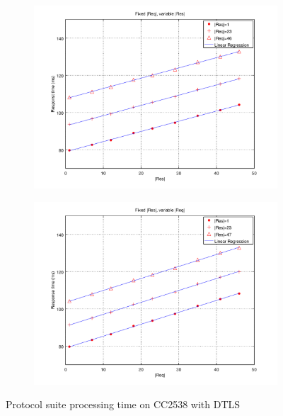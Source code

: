 \begin{figure}[ht!]
	\center
	\begin{subfigure}{0.8\linewidth}
	\center
	\includegraphics[width=\textwidth]{fig/dtlstime_fixed_req.png}
	\end{subfigure}
	\begin{subfigure}{0.8\linewidth}
	\center
	\includegraphics[width=\textwidth]{fig/dtlstime_fixed_res.png}
	\end{subfigure}
	\caption{Protocol suite processing time on CC2538 with DTLS}
	\label{Fig: Protocol suite processing time on CC2538 with DTLS}
\end{figure}

